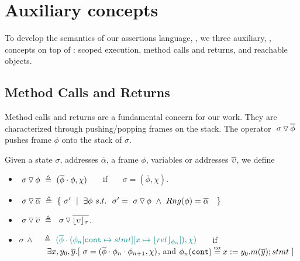 \section{Auxiliary concepts}
\label{s:auxiliary}

{To develop the semantics of our assertions language, \AssertLang, we    three auxiliary, , concepts on  top of  \LangOO: scoped execution, method calls and returns, and reachable objects.}

\subsection{ Method Calls and Returns}

 
 
Method calls and returns are a fundamental concern for our work. 
They are characterized through pushing/popping   frames on the stack.  
The operator   $  \ {\sigma} \, {\triangledown}\, \overline{\phi} $ pushes 
frame $\phi$ onto the stack of $\sigma$.
 
 

\begin{definition}
\label{def:push:frame}
Given a state $\sigma$, addresses $\overline \alpha$, a frame $\phi$,  variables or addresses $\overline {\upsilon}$, we define
\begin{itemize}
\item
 $  \ {\sigma} \, {\triangledown}\, {\phi}  \ \triangleq \ ({\overline{\phi}\cdot\phi}, \chi)$ \ \ \  if \ \ \  $\sigma=(\overline{\phi}, \chi)$.
\item
$ \PushS  {\alpha} {\sigma} \ \triangleq\ \{ \ \sigma' \ \mid\ \exists \phi  \ s.t.\ \ 
   \sigma'=\PushSF  {\phi} {\sigma}  \ \wedge\    Rng(\phi)=\overline \alpha \ \   \ \}$
\item
{$  \ {\sigma} \, {\triangledown}\, \overline{\upsilon} \  \triangleq\      \ {\sigma} \, {\triangledown}\, \overline{\lfloor \upsilon \rfloor_{\sigma}}  $.}
\item
$ \sigma\, \popSymbol \ \ \  \triangleq\   \sdN{ (\overline{\phi}\cdot (\phi_n[\prg{cont}\mapsto stmt][x \mapsto \interpret {\phi_n}{ret}]), \chi)}$ \ \ \  if \\
 $\strut \hspace{1.2cm}  \exists x, y_0, \overline y. [ \ \sigma=(\overline{\phi}\cdot\phi_n\cdot\phi_{n+1}, \chi)$, and $\phi_n(\prg{cont})\txteq x:= y_0.m(\overline y); stmt \ ]$
\end{itemize}
 \end{definition}

